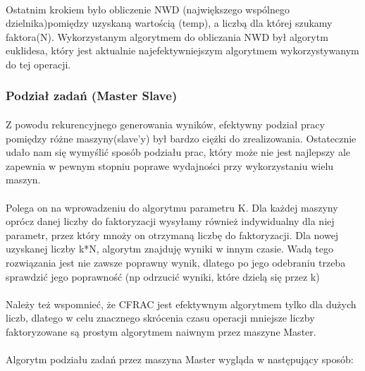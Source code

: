 \documentclass{article}
\begin{document}
\paragraph{}Ostatnim krokiem było obliczenie NWD (największego wspólnego dzielnika)pomiędzy uzyskaną wartością (temp), a liczbą dla której szukamy faktora(N). Wykorzystanym algorytmem do obliczania NWD był algorytm euklidesa, który jest aktualnie najefektywniejszym algorytmem wykorzystywanym do tej operacji.

\subsubsection{Podział zadań (Master Slave)}

\paragraph{}Z powodu rekurencyjnego generowania wyników, efektywny podział pracy pomiędzy różne maszyny(slave'y) był bardzo ciężki do zrealizowania. Ostatecznie udało nam się wymyślić sposób podziału prac, który może nie jest najlepszy ale zapewnia w pewnym stopniu poprawe wydajności przy wykorzystaniu wielu maszyn.

\paragraph{}Polega on na wprowadzeniu do algorytmu parametru K. Dla każdej maszyny oprócz danej liczby do faktoryzacji wysyłamy również indywidualny dla niej parametr, przez który mnoży on otrzymaną liczbę do faktoryzacji. Dla nowej uzyskanej liczby k*N, algorytm znajduję wyniki w innym czasie. Wadą tego rozwiązania jest nie zawsze poprawny wynik, dlatego po jego odebraniu trzeba sprawdzić jego poprawność (np odrzucić wyniki, które dzielą się przez k)

\paragraph{}Należy też wspomnieć, że CFRAC jest efektywnym algorytmem tylko dla dużych liczb, dlatego w celu znacznego skrócenia czasu operacji mniejsze liczby faktoryzowane są prostym algorytmem naiwnym przez maszyne Master.

\paragraph{}Algorytm podziału zadań przez maszyna Master wygląda w następujący sposób:
\end{document}
